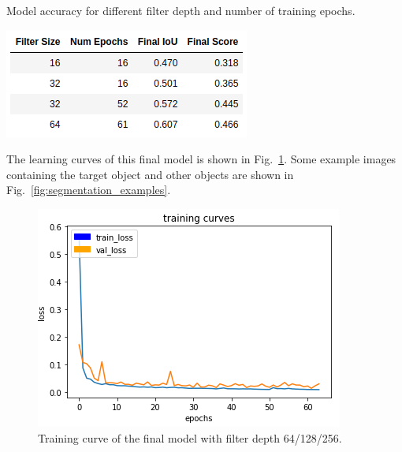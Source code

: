 \documentclass[twoside, twocolumn]{article}
\newcommand{\figref}[1]{Fig.~\ref{fig:#1}}
\begin{document}
\begin{table}[ht]
\centering
\caption{\label{tab:results} Model accuracy for different filter depth and number of training epochs.}
\includegraphics[width=\columnwidth]{fig/results.png}
\end{table}

The learning curves of this final model is shown in \figref{training_curve}. Some
example images containing the target object and other objects are shown in
\figref{segmentation_examples}.

\begin{figure}[ht]
\centering
\includegraphics[width=\columnwidth]{fig/training_curve.png}
\caption{\label{fig:training_curve} Training curve of the final model with filter depth 64/128/256.}
\end{figure}
\end{document}
